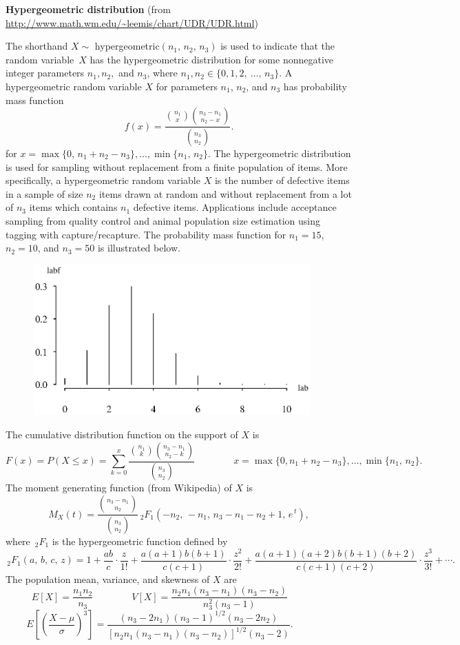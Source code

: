 \documentclass[12pt,fullpage]{article}
\begin{document}
\noindent
{\bf Hypergeometric distribution}
(from \color{blue}\url{http://www.math.wm.edu/~leemis/chart/UDR/UDR.html}\color{black})

\noindent
The shorthand $X \sim$ hypergeometric$(n_1,\, n_2,\, n_3)$ is used to indicate
that the random variable~$X$ has the hypergeometric distribution for some
nonnegative integer parameters $n_1, n_2,$ and $n_3$,
where $n_1, n_2 \in \{ 0, 1, 2, ~\ldots,\, n_3\}$.
A hypergeometric random variable $X$ for parameters $n_1$, $n_2$, and $n_3$
has probability mass function 
$$
f(x) = \frac{{n_1 \choose x} {n_3 - n_1\choose n_2 - x}}{{n_3 \choose n_2}}.
$$
for $x = \max\{0,\, n_1 + n_2 - n_3\}, \ldots, \min\{n_1,\,n_2\}$.
The hypergeometric distribution is used for sampling without replacement from a
finite population of items. 
More specifically, a hypergeometric random variable $X$ is the number of
defective items in a sample of size $n_2$ items drawn at random and without
replacement from a lot of $n_3$ items which contains $n_1$ defective items.
Applications include acceptance sampling from quality control and animal
population size estimation using tagging with capture/recapture.
The probability mass function for $n_1 = 15$, $n_2 = 10$, and $n_3 = 50$
is illustrated below.

\begin{figure}[h!]
\begin{center}
\includegraphics[width=4.2in]{HypergeometricPlot.ps}
\end{center}
\end{figure}

\noindent
The cumulative distribution function on the support of $X$ is
$$
F(x) = P(X \leq x) = \sum_{k = 0} ^ x \frac{{n_1 \choose k}
{n_3 - n_1 \choose n_2 - k}}{{n_3 \choose n_2}}\qquad \qquad
x=\max\{0, n_1 + n_2 - n_3\}, \ldots, \min\{n_1, \,n_2\}. 
$$
The moment generating function (from Wikipedia) of $X$ is 
$$
M_X(t) =
\frac{
{n_3 - n_1 \choose n_2}
}
{
{n_3 \choose n_2}
}
\, _ 2 F _ 1 \left( -n_2, \, -n_1, \, n_3 - n_1 - n_2 + 1, \, e ^ {\, t} \right),
$$
where $\, _ 2 F _ 1$ is the hypergeometric function defined by 
$$
\, _ 2 F _ 1 (a, \, b, \, c, \, z) =
1 + 
\frac{ab}{c} \cdot \frac{z}{1!} +
\frac{a(a+1)b(b+1)}{c(c+1)} \cdot \frac{z^2}{2!} +
\frac{a(a+1)(a+2)b(b+1)(b+2)}{c(c+1)(c+2)} \cdot \frac{z^3}{3!} + \cdots .
$$
The population mean, variance, and skewness of $X$ are
$$
E[X] = \frac{n_1 n_2}{n_3} \qquad \qquad
V[X]=\frac{n_2 n_1(n_3 - n_1)(n_3 - n_2)}{n_3 ^ 2(n_3 - 1)} \qquad \qquad
$$
$$
E\left[ \left( \frac{X - \mu}{\sigma} \right) ^ 3 \right] =
\frac{(n_3 - 2n_1)(n_3 - 1) ^ {1 / 2}(n_3 - 2n_2)}
{\left[n_2 n_1(n_3 - n_1)(n_3 - n_2)\right] ^ {1 / 2}(n_3 - 2)}. \qquad \qquad 
$$
\end{document}
